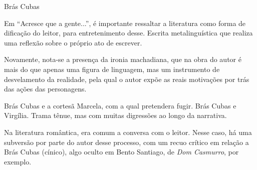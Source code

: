 \begin{corollary}
Brás Cubas %
\end{corollary}

Em ``Acresce que a gente...'', é importante ressaltar a literatura como forma de dificação do leitor, para entretenimento desse. Escrita metalinguística que realiza uma reflexão sobre o próprio ato de escrever.

Novamente, nota-se a presença da ironia machadiana, que na obra do autor é mais do que apenas uma figura de linguagem, mas um instrumento de desvelamento da realidade, pela qual o autor expõe as reais motivações por trás das ações das personagens.

Brás Cubas e a cortesã Marcela, com a qual pretendera fugir. Brás Cubas e Virgília. Trama tênue, mas com muitas digressões ao longo da narrativa.

Na literatura romântica, era comum a conversa com o leitor. Nesse caso, há uma subversão por parte do autor desse processo, com um recuo crítico em relação a Brás Cubas (cínico), algo oculto em Bento Santiago, de \textit{Dom Casmurro}, por exemplo.

